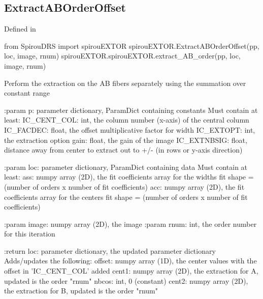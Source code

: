 \noindent\begin{minipage}{\textwidth}
\subsection{ExtractABOrderOffset}

Defined in \spirouEXTOR{}

\begin{pythonbox}
from SpirouDRS import spirouEXTOR
spirouEXTOR.ExtractABOrderOffset(pp, loc, image, rnum)
spirouEXTOR.spirouEXTOR.extract_AB_order(pp, loc, image, rnum)
\end{pythonbox}

\begin{pythondocstring}
Perform the extraction on the AB fibers separately using the summation
over constant range

:param p: parameter dictionary, ParamDict containing constants
    Must contain at least:
            IC_CENT_COL: int, the column number (x-axis) of the central
                         column
            IC_FACDEC: float, the offset multiplicative factor for width
            IC_EXTOPT: int, the extraction option
            gain: float, the gain of the image
            IC_EXTNBSIG: float, distance away from center to extract
                         out to +/- (in rows or y-axis direction)

:param loc: parameter dictionary, ParamDict containing data
        Must contain at least:
            ass: numpy array (2D), the fit coefficients array for
                  the widths fit
                  shape = (number of orders x number of fit coefficients)
            acc: numpy array (2D), the fit coefficients array for
                  the centers fit
                  shape = (number of orders x number of fit coefficients)


:param image: numpy array (2D), the image
:param rnum: int, the order number for this iteration

:return loc: parameter dictionary, the updated parameter dictionary
        Adds/updates the following:
            offset: numpy array (1D), the center values with the
                    offset in 'IC_CENT_COL' added
            cent1: numpy array (2D), the extraction for A, updated is
                   the order "rnum"
            nbcos: int, 0 (constant)
            cent2: numpy array (2D), the extraction for B, updated is
                   the order "rnum"
\end{pythondocstring}
\end{minipage}

